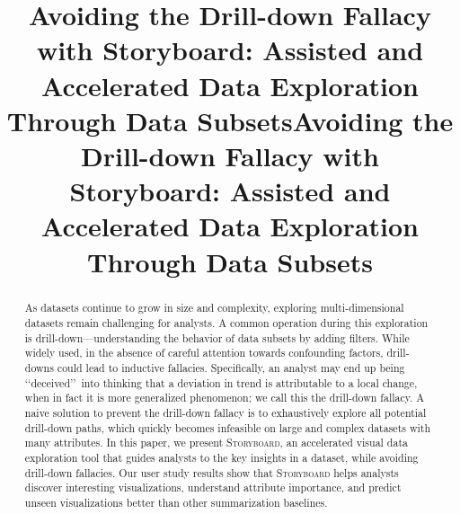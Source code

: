 \documentclass[sigchi]{acmart}
\title{Avoiding the Drill-down Fallacy with Storyboard: Assisted and Accelerated Data Exploration Through Data Subsets}
\newcommand{\system}{\textsc{Storyboard}\xspace}
\begin{document}
\title{Avoiding the Drill-down Fallacy with Storyboard: Assisted and Accelerated Data Exploration Through Data Subsets}
\maketitle
\begin{abstract}
As datasets continue to grow in size and complexity, exploring multi-dimensional datasets remain challenging for analysts. A common operation during this exploration is drill-down---understanding the behavior of data subsets by adding filters. While widely used, in the absence of careful attention towards confounding factors, drill-downs could lead to inductive fallacies. Specifically, an analyst may end up being \lq\lq deceived\rq\rq\ into thinking that a deviation in trend is attributable to a local change, when in fact it is more generalized phenomenon; we call this the drill-down fallacy. A naive solution to prevent the drill-down fallacy is to exhaustively explore all potential drill-down paths, which quickly becomes infeasible on large and complex datasets with many attributes. In this paper, we present \system, an accelerated visual data exploration tool that guides analysts to the key insights in a dataset, while avoiding drill-down fallacies. Our user study results show that \system helps analysts discover interesting visualizations, understand attribute importance, and predict unseen visualizations better than other summarization baselines.
\end{abstract}
\end{document}
